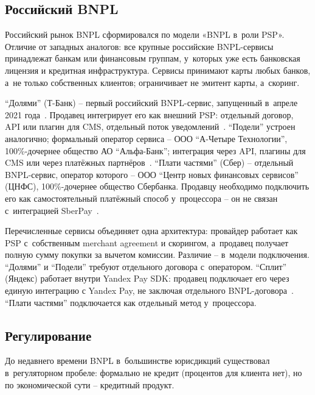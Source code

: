 \subsection*{Российский BNPL}

Российский рынок BNPL сформировался по модели «BNPL в~роли PSP».
Отличие от западных аналогов: все крупные российские
BNPL-сервисы принадлежат банкам или финансовым группам, у~которых
уже есть банковская лицензия и кредитная инфраструктура. Сервисы
принимают карты любых банков, а~не только собственных клиентов;
ограничивает не эмитент карты, а~скоринг.

\enquote{Долями} (Т-Банк) -- первый российский BNPL-сервис,
запущенный в~апреле 2021 года~\cite{tbank-dolyame}. Продавец
интегрирует его как внешний PSP: отдельный договор, API или
плагин для CMS, отдельный поток
уведомлений~\cite{tbank-dolyame-business}. \enquote{Подели}
устроен аналогично; формальный оператор сервиса -- ООО
\enquote{А-Четыре Технологии}, 100\%-дочернее общество
АО \enquote{Альфа-Банк}; интеграция через API, плагины для CMS
или через платёжных
партнёров~\cite{alfa-podeli,alfa-podeli-business}.
\enquote{Плати частями} (Сбер) -- отдельный BNPL-сервис,
оператор которого -- ООО \enquote{Центр новых финансовых
сервисов} (ЦНФС), 100\%-дочернее общество Сбербанка. Продавцу
необходимо подключить его как самостоятельный платёжный способ
у~процессора -- он не связан с~интеграцией
SberPay~\cite{sber-pay-parts}.

Перечисленные сервисы объединяет одна архитектура: провайдер
работает как PSP с~собственным merchant agreement и скорингом,
а~продавец получает полную сумму покупки за вычетом комиссии.
Различие -- в~модели подключения. \enquote{Долями}
и \enquote{Подели} требуют отдельного договора с~оператором.
\enquote{Сплит} (Яндекс) работает внутри Yandex Pay SDK:
продавец подключает его через единую интеграцию с Yandex Pay,
не заключая отдельного BNPL-договора~\cite{yandex-split}.
\enquote{Плати частями} подключается как отдельный метод
у~процессора.

\subsection*{Регулирование}

До недавнего времени BNPL в~большинстве юрисдикций существовал
в~регуляторном пробеле: формально не кредит (процентов для клиента
нет), но по экономической сути -- кредитный продукт.

